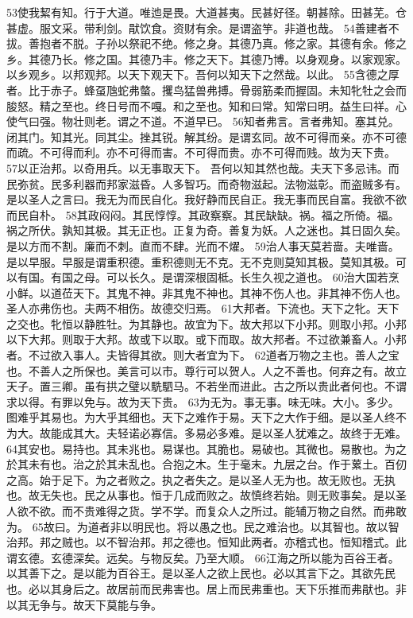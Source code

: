 \documentclass[a5paper,zihao=-4,oneside,UTF8]{ctexart}
\begin{document}
53使我絜有知。行于大道。唯迆是畏。大道甚夷。民甚好径。朝甚除。田甚芜。仓甚虚。服文采。带利剑。猒饮食。资财有余。是谓盗竽。非道也哉。
54善建者不拔。善抱者不脱。子孙以祭祀不绝。修之身。其德乃真。修之家。其德有余。修之乡。其德乃长。修之国。其德乃丰。修之天下。其德乃博。以身观身。以家观家。以乡观乡。以邦观邦。以天下观天下。吾何以知天下之然哉。以此。
55含德之厚者。比于赤子。蜂虿虺蛇弗螫。攫鸟猛兽弗搏。骨弱筋柔而握固。未知牝牡之会而朘怒。精之至也。终日号而不嘎。和之至也。知和曰常。知常曰明。益生曰祥。心使气曰强。物壮则老。谓之不道。不道早已。
56知者弗言。言者弗知。塞其兑。闭其门。知其光。同其尘。挫其锐。解其纷。是谓玄同。故不可得而亲。亦不可德而疏。不可得而利。亦不可得而害。不可得而贵。亦不可得而贱。故为天下贵。
57以正治邦。以奇用兵。以无事取天下。
吾何以知其然也哉。夫天下多忌讳。而民弥贫。民多利器而邦家滋昏。人多智巧。而奇物滋起。法物滋彰。而盗贼多有。是以圣人之言曰。我无为而民自化。我好静而民自正。我无事而民自富。我欲不欲而民自朴。
58其政闷闷。其民惇惇。其政察察。其民缺缺。祸。福之所倚。福。祸之所伏。孰知其极。其无正也。正复为奇。善复为妖。人之迷也。其日固久矣。是以方而不割。廉而不刺。直而不肆。光而不燿。
59治人事天莫若啬。夫唯啬。是以早服。早服是谓重积德。重积德则无不克。无不克则莫知其极。莫知其极。可以有国。有国之母。可以长久。是谓深根固柢。长生久视之道也。
60治大国若烹小鲜。以道莅天下。其鬼不神。非其鬼不神也。其神不伤人也。非其神不伤人也。圣人亦弗伤也。夫两不相伤。故德交归焉。
61大邦者。下流也。天下之牝。天下之交也。牝恒以静胜牡。为其静也。故宜为下。故大邦以下小邦。则取小邦。小邦以下大邦。则取于大邦。故或下以取。或下而取。故大邦者。不过欲兼畜人。小邦者。不过欲入事人。夫皆得其欲。则大者宜为下。
62道者万物之主也。善人之宝也。不善人之所保也。美言可以市。尊行可以贺人。人之不善也。何弃之有。故立天子。置三卿。虽有拱之璧以駪駟马。不若坐而进此。古之所以贵此者何也。不谓求以得。有罪以免与。故为天下贵。
63为无为。事无事。味无味。大小。多少。图难乎其易也。为大乎其细也。天下之难作于易。天下之大作于细。是以圣人终不为大。故能成其大。夫轻诺必寡信。多易必多难。是以圣人犹难之。故终于无难。
64其安也。易持也。其未兆也。易谋也。其脆也。易破也。其微也。易散也。为之於其未有也。治之於其未乱也。合抱之木。生于毫末。九层之台。作于蔂土。百仞之高。始于足下。为之者败之。执之者失之。是以圣人无为也。故无败也。无执也。故无失也。民之从事也。恒于几成而败之。故慎终若始。则无败事矣。是以圣人欲不欲。而不贵难得之货。学不学。而复众人之所过。能辅万物之自然。而弗敢为。
65故曰。为道者非以明民也。将以愚之也。民之难治也。以其智也。故以智治邦。邦之贼也。以不智治邦。邦之德也。恒知此两者。亦稽式也。恒知稽式。此谓玄德。玄德深矣。远矣。与物反矣。乃至大顺。
66江海之所以能为百谷王者。以其善下之。是以能为百谷王。是以圣人之欲上民也。必以其言下之。其欲先民也。必以其身后之。故居前而民弗害也。居上而民弗重也。天下乐推而弗猒也。非以其无争与。故天下莫能与争。
\end{document}
